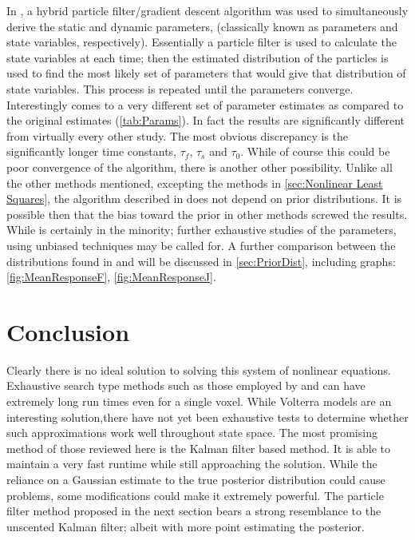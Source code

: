 In \cite{Johnston2008}, a hybrid particle filter/gradient
descent algorithm was used to simultaneously derive the static and dynamic 
parameters, (classically known as parameters and state variables, respectively).
Essentially a particle filter is used to calculate the state variables at each
time; then the estimated distribution of the particles is used to find
the most likely set of parameters that would give that distribution of state variables.
This process is repeated until the parameters converge. Interestingly
\cite{Johnston2008} comes to a very different set of parameter estimates as compared
to the original \cite{Friston2000} estimates (\autoref{tab:Params}). In fact the results 
are significantly different from virtually every other study. The most obvious discrepancy
is the significantly longer time constants, $\tau_f$, $\tau_s$ and $\tau_0$. 
While of course this could be poor convergence of the algorithm, there is another other possibility.
Unlike all the other methods mentioned, excepting the methods in \autoref{sec:Nonlinear Least Squares},
the algorithm described in \cite{Johnston2008} does not depend on prior distributions.
It is possible then that the bias toward the prior in other methods screwed the results. 
While \cite{Johnston2008} is certainly in the minority; further exhaustive studies 
of the parameters, using unbiased techniques may be called for. A further 
comparison between the distributions found in \cite{Johnston2008} and 
\cite{Friston2000} will be discussed in \autoref{sec:PriorDist}, including
graphs: \autoref{fig:MeanResponseF}, \autoref{fig:MeanResponseJ}.

\section{Conclusion}
Clearly there is no ideal solution to solving this system of nonlinear
equations. Exhaustive search type methods such as those employed by
\cite{Johnston2008} and \cite{Vakorin2007} can have extremely long
run times even for a single voxel. While Volterra models are an interesting
solution,there have not yet been exhaustive tests to determine whether
such approximations work well throughout state space. The most promising
method of those reviewed here is the Kalman filter based method. It is
able to maintain a very fast runtime while still approaching the solution.
While the reliance on a Gaussian estimate to the true posterior distribution could
cause problems, some modifications could make it extremely powerful. 
The particle filter method proposed in the next section bears a strong 
resemblance to the unscented Kalman filter; albeit with more point estimating
the posterior. 

